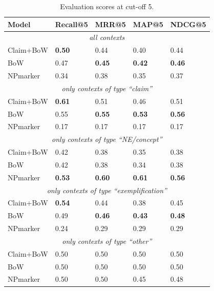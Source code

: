 \begin{table}
\centering
    \caption{Evaluation scores at cut-off 5.}
    \label{tab:userevalnumbers}
\begin{center}
    \begin{tabular}{lllll}
    \toprule
    Model & Recall@5 & MRR@5 & MAP@5 & NDCG@5 \\
    \midrule
    \multicolumn{5}{c}{\emph{all contexts}} \\
    \midrule
    Claim+BoW & \textbf{0.50} & 0.44 & 0.40 & 0.44 \\
    BoW       & 0.47 & \textbf{0.45} & \textbf{0.42} & \textbf{0.46} \\
    NPmarker  & 0.34 & 0.38 & 0.35 & 0.37 \\
    \midrule
    \multicolumn{5}{c}{\emph{only contexts of type ``claim''}} \\
    \midrule
    Claim+BoW & \textbf{0.61} & 0.51 & 0.46 & 0.51 \\
    BoW       & 0.55 & \textbf{0.55} & \textbf{0.53} & \textbf{0.56} \\
    NPmarker  & 0.17 & 0.17 & 0.17 & 0.17 \\
    \midrule
    \multicolumn{5}{c}{\emph{only contexts of type ``NE/concept''}} \\
    \midrule
    Claim+BoW & 0.42 & 0.38 & 0.35 & 0.38 \\
    BoW       & 0.42 & 0.38 & 0.34 & 0.38 \\
    NPmarker  & \textbf{0.53} & \textbf{0.60} & \textbf{0.61} & \textbf{0.56} \\
    \midrule
    \multicolumn{5}{c}{\emph{only contexts of type ``exemplification''}} \\
    \midrule
    Claim+BoW & \textbf{0.54} & 0.44 & 0.38 & 0.45 \\
    BoW       & 0.49 & \textbf{0.46} & \textbf{0.43} & \textbf{0.48} \\
    NPmarker  & 0.24 & 0.29 & 0.29 & 0.29 \\
    \midrule
    \multicolumn{5}{c}{\emph{only contexts of type ``other''}} \\
    \midrule
    Claim+BoW & 0.50 & 0.50 & 0.50 & 0.50 \\
    BoW       & 0.50 & 0.50 & 0.50 & 0.50 \\
    NPmarker  & 0.50 & 0.50 & 0.45 & 0.48 \\
    \bottomrule
    \end{tabular}
\end{center}
\end{table}

